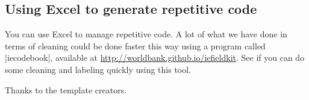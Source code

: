\documentclass{tufte-handout}
\begin{document}
\subsection{Using Excel to generate repetitive code}

You can use Excel to manage repetitive code.
A lot of what we have done in terms of cleaning
could be done faster this way using a program called |iecodebook|,
available at \url{http://worldbank.github.io/iefieldkit}.
See if you can do some cleaning and labeling quickly using this tool.

\begin{figure}[h]
{
}
\end{figure}


\begin{figure}[h]
{
}
\end{figure}


\begin{figure}[h]
{
}
\end{figure}

Thanks to the template creators.\cite{tuftelatex}



\end{document}
